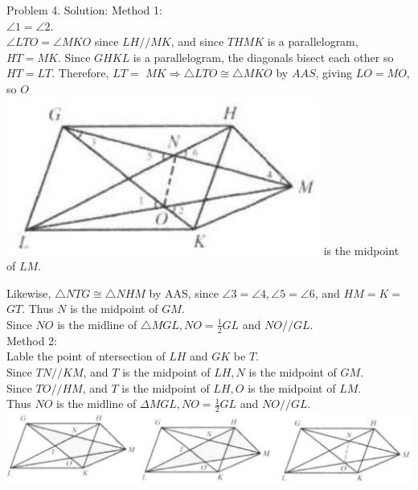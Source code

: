 \documentclass[10pt]{article}
\begin{document}
Problem 4. Solution:
Method 1:\\
\(\angle 1=\angle 2\).\\
\(\angle L T O=\angle M K O\) since \(L H / / M K\), and since \(T H M K\) is a parallelogram, \(H T=M K\). Since \(G H K L\) is a parallelogram, the diagonals bisect each other so \(H T=L T\). Therefore, \(L T=\) \(M K \Rightarrow \triangle L T O \cong \triangle M K O\) by \(A A S\), giving \(L O=M O\), so \(O\)\\
\includegraphics[max width=\textwidth]{2025_04_17_97bc1f7e44d93c271a88g-048(1)} is the midpoint of \(L M\).


Likewise, \(\triangle N T G \cong \triangle N H M\) by AAS, since \(\angle 3=\angle 4, \angle 5=\angle 6\), and \(H M=K=\) \(G T\). Thus \(N\) is the midpoint of \(G M\).\\
Since \(N O\) is the midline of \(\triangle M G L, N O=\frac{1}{2} G L\) and \(N O / / G L\).\\
Method 2:\\
Lable the point of ntersection of \(L H\) and \(G K\) be \(T\).\\
Since \(T N / / K M\), and \(T\) is the midpoint of \(L H, N\) is the midpoint of \(G M\).\\
Since \(T O / / H M\), and \(T\) is the midpoint of \(L H, O\) is the midpoint of \(L M\).\\
Thus \(N O\) is the midline of \(\Delta M G L, N O=\frac{1}{2} G L\) and \(N O / / G L\).\\
\includegraphics[max width=\textwidth, center]{2025_04_17_97bc1f7e44d93c271a88g-049(1)}
\end{document}
